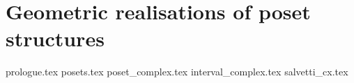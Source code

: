 \documentclass[class=article, crop=false]{standalone}
\begin{document}
\chapter{Geometric realisations of poset structures}
{prologue.tex}
{posets.tex}
{poset_complex.tex}
{interval_complex.tex}
{salvetti_cx.tex}
\end{document}
